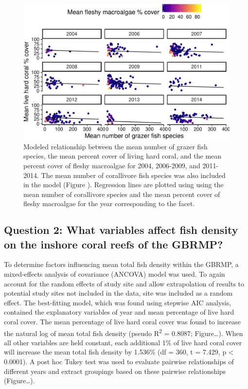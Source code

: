 \documentclass[12pt,]{article}
\begin{document}
\begin{figure}

\includegraphics{Mullaney_ENV872_Project_files/figure-latex/Coral Percent Cover Plot (Grazers)-1} \hfill{}

\caption{Modeled relationship between the mean number of grazer fish species, the mean percent cover of living hard coral, and the mean percent cover of fleshy macroalgae for 2004, 2006-2009, and 2011-2014. The mean number of corallivore fish species was also included in the model (Figure ). Regression lines are plotted using using the mean number of corallivore species and the mean percent cover of fleshy macroalgae for the year corresponding to the facet.}\label{fig:Coral Percent Cover Plot (Grazers)}
\end{figure}

\hypertarget{question-2-what-variables-affect-fish-density-on-the-inshore-coral-reefs-of-the-gbrmp}{%
\subsection{Question 2: What variables affect fish density on the
inshore coral reefs of the
GBRMP?}\label{question-2-what-variables-affect-fish-density-on-the-inshore-coral-reefs-of-the-gbrmp}}

To determine factors influencing mean total fish density within the
GBRMP, a mixed-effects analysis of covariance (ANCOVA) model was used.
To again account for the random effects of study site and allow
extrapolation of results to potential study sites not included in the
data, site was included as a random effect. The best-fitting model,
which was found using stepwise AIC analysis, contained the explanatory
variables of year and mean percentage of live hard coral cover. The mean
percentage of live hard coral cover was found to increase the natural
log of mean total fish density (pseudo R\textsuperscript{2} = 0.8087;
Figure\ldots{}). When all other variables are held constant, each
additional 1\% of live hard coral cover will increase the mean total
fish density by 1.536\% (df = 360, t = 7.429, p \textless{} 0.0001). A
post hoc Tukey test was used to evaluate pairwise relationships of
different years and extract groupings based on these pairwise
relationships (Figure\ldots{}).
\end{document}
